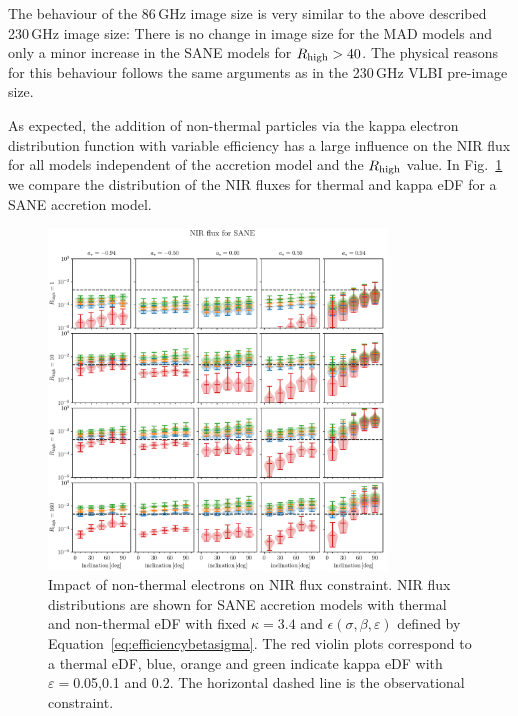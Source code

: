 
The behaviour of the 86\,GHz image size is very similar to the above described 230\,GHz image size: There is no change in image size for the MAD models and only a minor increase in the SANE models for $R_\mathrm{high}>40$. The physical reasons for this behaviour follows the same arguments as in the 230\,GHz VLBI pre-image size.

As expected, the addition of non-thermal particles via the kappa electron distribution function with variable efficiency has a large influence on the NIR flux for all models independent of the accretion model and the $R_\mathrm{high}$ value. In Fig.~\ref{fig:NIR_kappaepsilon} we compare the distribution of the NIR fluxes for thermal and kappa eDF for a SANE accretion model.

\begin{figure}
  \centering
  \includegraphics[width=0.8\textwidth]{./figures/SANE_NIR_standard.pdf}
  \caption{Impact of non-thermal electrons on NIR flux constraint. NIR flux distributions are shown for SANE accretion models with thermal and non-thermal eDF with fixed $\kappa=3.4$ and $\epsilon\left(\sigma,\beta,\varepsilon\right)$ defined by Equation~\ref{eq:efficiencybetasigma}. The red violin plots correspond to a thermal eDF, blue, orange and green indicate kappa eDF with $\varepsilon=$0.05,0.1 and 0.2. The horizontal dashed line is the observational constraint.}
  \label{fig:NIR_kappaepsilon}
\end{figure}


